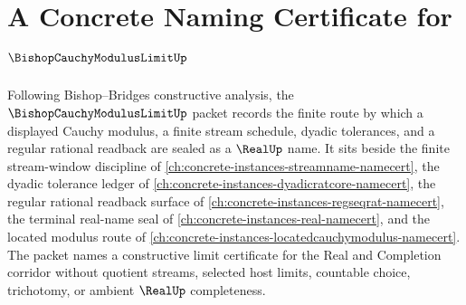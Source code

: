 \chapter{A Concrete Naming Certificate for $\BishopCauchyModulusLimitUp$}
\label{ch:concrete-instances-bishop-cauchy-modulus-limit-namecert}

Following Bishop--Bridges constructive analysis, the $\BishopCauchyModulusLimitUp$ packet records the finite route by which a displayed Cauchy modulus, a finite stream schedule, dyadic tolerances, and a regular rational readback are sealed as a $\RealUp$ name. It sits beside the finite stream-window discipline of \autoref{ch:concrete-instances-streamname-namecert}, the dyadic tolerance ledger of \autoref{ch:concrete-instances-dyadicratcore-namecert}, the regular rational readback surface of \autoref{ch:concrete-instances-regseqrat-namecert}, the terminal real-name seal of \autoref{ch:concrete-instances-real-namecert}, and the located modulus route of \autoref{ch:concrete-instances-locatedcauchymodulus-namecert}. The packet names a constructive limit certificate for the Real and Completion corridor without quotient streams, selected host limits, countable choice, trichotomy, or ambient $\RealUp$ completeness.

